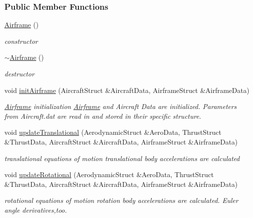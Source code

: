 \subsubsection*{Public Member Functions}
\begin{DoxyCompactItemize}
\item 
\mbox{\label{group___airframe_a5e6632c7d0c5bc5b889de6cc2407944f}} 
\hyperlink{group___airframe_a5e6632c7d0c5bc5b889de6cc2407944f}{Airframe} ()
\begin{DoxyCompactList}\small\item\em constructor \end{DoxyCompactList}\item 
\mbox{\label{group___airframe_af849116afbf7c4d7d2d5c189ff68cb7d}} 
\hyperlink{group___airframe_af849116afbf7c4d7d2d5c189ff68cb7d}{$\sim$\+Airframe} ()
\begin{DoxyCompactList}\small\item\em destructor \end{DoxyCompactList}\item 
\mbox{\label{group___airframe_a57b5f7a74d11723186f34fc183e1581b}} 
void \hyperlink{group___airframe_a57b5f7a74d11723186f34fc183e1581b}{init\+Airframe} (Aircraft\+Struct \&Aircraft\+Data, Airframe\+Struct \&Airframe\+Data)
\begin{DoxyCompactList}\small\item\em \hyperlink{group___airframe_class_airframe}{Airframe} initialization \hyperlink{group___airframe_class_airframe}{Airframe} and Aircraft Data are initialized. Parameters from Aircraft.\+dat are read in and stored in their specific structure. \end{DoxyCompactList}\item 
void \hyperlink{group___airframe_ab3e18bd40fd5e68d793a164654a2821a}{update\+Translational} (Aerodynamic\+Struct \&Aero\+Data, Thrust\+Struct \&Thrust\+Data, Aircraft\+Struct \&Aircraft\+Data, Airframe\+Struct \&Airframe\+Data)
\begin{DoxyCompactList}\small\item\em translational equations of motion translational body accelerations are calculated \end{DoxyCompactList}\item 
void \hyperlink{group___airframe_af506bca34fa40f9ec0613b3be8f726eb}{update\+Rotational} (Aerodynamic\+Struct \&Aero\+Data, Thrust\+Struct \&Thrust\+Data, Aircraft\+Struct \&Aircraft\+Data, Airframe\+Struct \&Airframe\+Data)
\begin{DoxyCompactList}\small\item\em rotational equations of motion rotation body accelerations are calculated. Euler angle derivatives,too. \end{DoxyCompactList}\end{DoxyCompactItemize}


